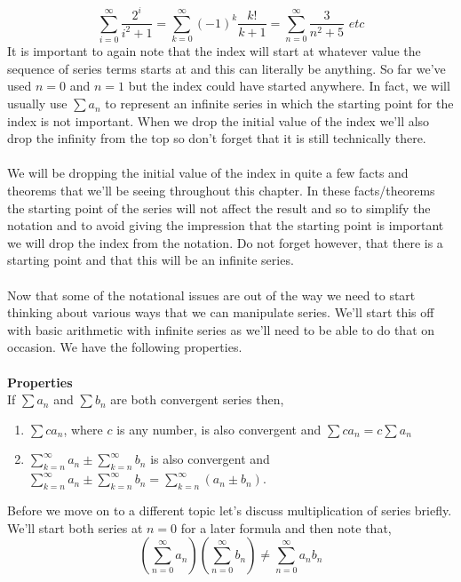 \documentclass[10pt,reqno]{book}
\theoremstyle{definition}
\begin{document}
	\[ \sum\limits_{i=0}^{\infty} \frac{2^i}{i^2 + 1} = \sum\limits_{k=0}^{\infty} (-1)^k \frac{k!}{k+1} = \sum\limits_{n=0}^{\infty} \frac{3}{n^2 + 5} \, \, etc   \]
	It is important to again note that the index will start at whatever value the sequence of series terms starts at and this can literally be anything. So far we've used $ n=0 $ and $ n=1 $ but the index could have started anywhere. In fact, we will usually use $ \sum a_n $ to represent an infinite series in which the starting point for the index is not important. When we drop the initial value of the index we'll also drop the infinity from the top so don't forget that it is still technically there.\\ \\
	We will be dropping the initial value of the index in quite a few facts and theorems that we'll be seeing throughout this chapter. In these facts/theorems the starting point of the series will not affect the result and so to simplify the notation and to avoid giving the impression that the starting point is important we will drop the index from the notation. Do not forget however, that there is a starting point and that this will be an infinite series.\\ \\
	Now that some of the notational issues are out of the way we need to start thinking about various ways that we can manipulate series. We'll start this off with basic arithmetic with infinite series as we’ll need to be able to do that on occasion. We have the following properties.\\ \\
	\textbf{Properties}\\
	If $ \sum a_n $ and $ \sum b_n $ are both convergent series then,
	\begin{enumerate}
		\item $ \sum c a_n $, where $ c $ is any number, is also convergent and $ \sum c a_n = c \sum a_n $
		
		\item $ \sum\limits_{k=n}^{\infty} a_n \pm \sum\limits_{k=n}^{\infty} b_n $ is also convergent and $ \sum\limits_{k=n}^{\infty} a_n \pm \sum\limits_{k=n}^{\infty} b_n = \sum\limits_{k=n}^{\infty} (a_n \pm b_n) $.
	\end{enumerate}
	Before we move on to a different topic let's discuss multiplication of series briefly. We'll start both series at $ n=0 $ for a later formula and then note that,
	\[ \left( \sum\limits_{n=0}^{\infty} a_n \right)  \left( \sum\limits_{n=0}^{\infty} b_n \right) \neq \sum\limits_{n=0}^{\infty} a_n b_n \]
\end{document}
